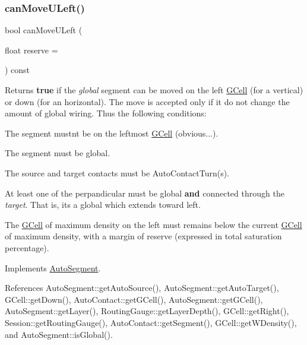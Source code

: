 \subsubsection{\texorpdfstring{can\+Move\+U\+Left()}{canMoveULeft()}}
{\footnotesize\ttfamily bool can\+Move\+U\+Left (\begin{DoxyParamCaption}\item[{float}]{reserve = {} }\end{DoxyParamCaption}) const\hspace{0.3cm}{\ttfamily [virtual]}}

\begin{DoxyReturn}{Returns}
{\bfseries true} if the {\itshape global} segment can be moved on the left \mbox{\hyperlink{classKatabatic_1_1GCell}{G\+Cell}} (for a vertical) or down (for an horizontal). The move is accepted only if it do not change the amount of global wiring. Thus the following conditions\+:
\begin{DoxyItemize}
\item The segment mustn\textquotesingle{}t be on the leftmost \mbox{\hyperlink{classKatabatic_1_1GCell}{G\+Cell}} (obvious...).
\item The segment must be global.
\item The source and target contacts must be Auto\+Contact\+Turn(s).
\item At least one of the perpandicular must be global {\bfseries and} connected through the {\itshape target}. That is, it\textquotesingle{}s a global which extends toward left.
\item The \mbox{\hyperlink{classKatabatic_1_1GCell}{G\+Cell}} of maximum density on the left must remains below the current \mbox{\hyperlink{classKatabatic_1_1GCell}{G\+Cell}} of maximum density, with a margin of {\ttfamily reserve} (expressed in total saturation percentage). 
\end{DoxyItemize}
\end{DoxyReturn}


Implements \mbox{\hyperlink{classKatabatic_1_1AutoSegment_aad55626c9d793a0b08bcff5be2a5ad0c}{Auto\+Segment}}.



References Auto\+Segment\+::get\+Auto\+Source(), Auto\+Segment\+::get\+Auto\+Target(), G\+Cell\+::get\+Down(), Auto\+Contact\+::get\+G\+Cell(), Auto\+Segment\+::get\+G\+Cell(), Auto\+Segment\+::get\+Layer(), Routing\+Gauge\+::get\+Layer\+Depth(), G\+Cell\+::get\+Right(), Session\+::get\+Routing\+Gauge(), Auto\+Contact\+::get\+Segment(), G\+Cell\+::get\+W\+Density(), and Auto\+Segment\+::is\+Global().

